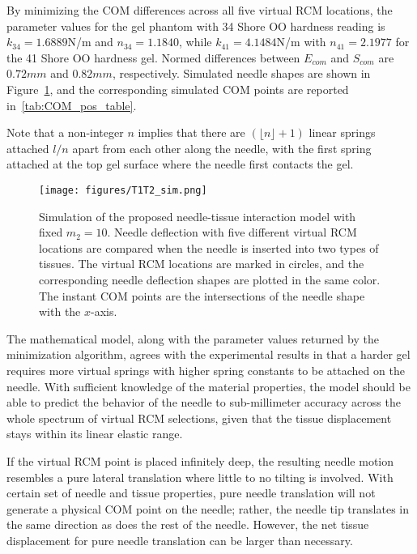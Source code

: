 By minimizing the COM differences across all five virtual RCM locations, the parameter values for the gel phantom with 34 Shore OO hardness reading is $k_{34} = 1.6889$N/m and $n_{34} = 1.1840$, while $k_{41} = 4.1484$N/m with $n_{41} = 2.1977$ for the 41 Shore OO hardness gel. Normed differences between $E_{com}$ and $S_{com}$ are $0.72mm$ and $0.82mm$, respectively. Simulated needle shapes are shown in Figure~\ref{fig:T1T2_sim}, and the corresponding simulated COM points are reported in~\cref{tab:COM_pos_table}.

Note that a non-integer $n$ implies that there are $(\lfloor n \rfloor + 1)$ linear springs attached $l/n$ apart from each other along the needle, with the first spring attached at the top gel surface where the needle first contacts the gel.

\begin{figure}[tb]
  \centering
  \texttt{[image: figures/T1T2\_sim.png]}
  \caption{Simulation of the proposed needle-tissue interaction model with fixed $m_2 = 10$. Needle deflection with five different virtual RCM locations are compared when the needle is inserted into two types of tissues. The virtual RCM locations are marked in circles, and the corresponding needle deflection shapes are plotted in the same color. The instant COM points are the intersections of the needle shape with the $x$-axis.}
  \label{fig:T1T2_sim}
\end{figure}

The mathematical model, along with the parameter values returned by the minimization algorithm, agrees with the experimental results in that a harder gel requires more virtual springs with higher spring constants to be attached on the needle. With sufficient knowledge of the material properties, the model should be able to predict the behavior of the needle to sub-millimeter accuracy across the whole spectrum of virtual RCM selections, given that the tissue displacement stays within its linear elastic range.

If the virtual RCM point is placed infinitely deep, the resulting needle motion resembles a pure lateral translation where little to no tilting is involved. With certain set of needle and tissue properties, pure needle translation will not generate a physical COM point on the needle; rather, the needle tip translates in the same direction as does the rest of the needle. However, the net tissue displacement for pure needle translation can be larger than necessary.

